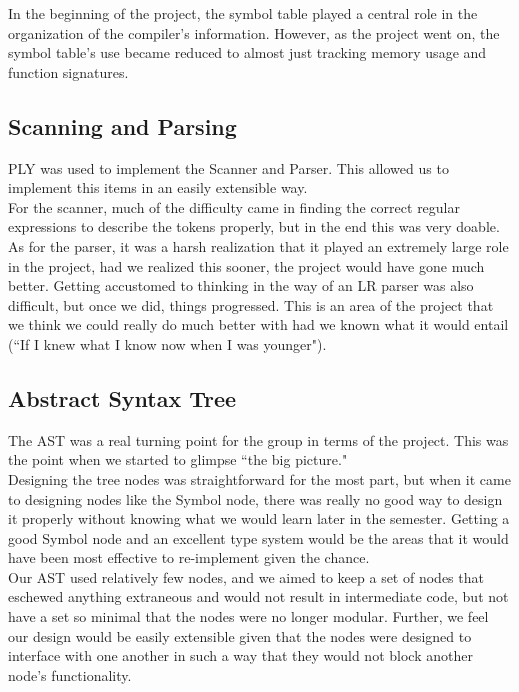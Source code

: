 \documentclass{article}
\begin{document}
\noindent In the beginning of the project, the symbol table played a central role in
the organization of the compiler's information. However, as the project went on,
the symbol table's use became reduced to almost just tracking memory usage and
function signatures.\\

\subsection{Scanning and Parsing}
\noindent PLY was used to implement the Scanner and Parser. This allowed us to implement
this items in an easily extensible way.\\

\noindent For the scanner, much of the difficulty came in finding the correct regular
expressions to describe the tokens properly, but in the end this was very 
doable.\\

\noindent As for the parser, it was a harsh realization that it played an extremely large
role in the project, had we realized this sooner, the project would have gone
much better. Getting accustomed to thinking in the way of an LR parser was
also difficult, but once we did, things progressed. This is an area of the
project that we think we could really do much better with had we known what it
would entail (``If I knew what I know now when I was younger").\\

\subsection{Abstract Syntax Tree}
\noindent The AST was a real turning point for the group in terms of the project. This
was the point when we started to glimpse ``the big picture."\\

\noindent Designing the tree nodes was straightforward for the most part, but when it
came to designing nodes like the Symbol node, there was really no good way to
design it properly without knowing what we would learn later in the semester.
Getting a good Symbol node and an excellent type system would be the areas that
it would have been most effective to re-implement given the chance.\\

\noindent Our AST used relatively few nodes, and we aimed to keep a set of nodes that 
eschewed anything extraneous and would not result in intermediate code, but not
have a set so minimal that the nodes were no longer modular. Further, we feel
our design would be easily extensible given that the nodes were designed to
interface with one another in such a way that they would not block another
node's functionality.
\end{document}

